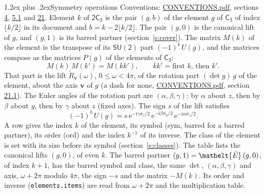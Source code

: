 \documentclass[10pt,a4paper]{article}
\makeatletter
\renewcommand\section{\@startsection{section}{1}{\z@}{-3ex plus -1ex minus -.2ex}%
  {1.2ex plus .2ex}{\normalfont\large\sffamily\bfseries\color{parttitle}}}
\numberwithin{equation}{section}
\newcommand{\eltfont}[1]{{\let\sigma\eltsigma\mathelt{#1}}}
\newcommand{\grp}[1]{\mathsf{#1}}
\newcommand{\elt}[1]{\eltfont{#1}}
\newcommand{\vv}{\mathbf{v}}
\newcommand{\iunit}{\mathrm{i}}
\newcommand{\expe}{\mathrm{e}}
\newcommand{\barred}[1]{\bar{#1}}
\newcommand{\lift}[1]{\tilde{#1}}
\newcommand{\pauli}[1]{\sigma_{#1}}
\makeatother
\begin{document}
\section{Symmetry operations}\label{s:elements}
Conventions: \href{../../CONVENTIONS.pdf}{CONVENTIONS.pdf}, sections \href{../../../rotation/CONVENTIONS.pdf\#conv.4}{4}, \href{../../../rotation/CONVENTIONS.pdf\#conv.5.1}{5.1} and \href{../../CONVENTIONS.pdf\#conv.21}{21}.
\leavevmode\label{n:index.element}\label{n:element.g}Element $k$ of $\grp{2C_{3}}$ is the pair $(g, b)$ of the element $g$ of \href{../../../rotation/data/pdf/C3.pdf}{$\grp{C_{3}}$} of index $\lfloor k/2\rfloor$ in its document and $b = k - 2\lfloor k/2\rfloor$. The pair $(g, 0)$ is the canonical lift of $g$, and $(g, 1)$ is its barred partner (section~\ref{s:cover}). \label{n:matrix.element.pin}\label{n:matrix.element}The matrix $M(k)$ of the element is the transpose of its $\grp{SU(2)}$ part $(-1)^{b}\,U(g)$, and the matrices compose as the matrices $P(g)$ of the elements of $\grp{C_{3}}$:
\begin{equation}\label{e:mprod}M(k)\,M(k') = M(kk'),\qquad kk' = \text{first } k\text{, then } k'.\end{equation}
\leavevmode\label{n:angle.omega}\label{n:vector.axis}\label{n:vector.pole}That part is the lift $\lift{R}_{\vv}(\omega)$, $0 \le \omega < 4\pi$, of the rotation part $(\det g)\,g$ of the element, about the axis $\vv$ of $g$ (a dash for none, \href{../../CONVENTIONS.pdf}{CONVENTIONS.pdf}, section \href{../../CONVENTIONS.pdf\#conv.21.1}{21.1}). \label{n:angle.euler.alpha}\label{n:angle.euler.beta}\label{n:angle.euler.gamma}\label{n:vector.coordinates}The Euler angles of the rotation part are $(\alpha,\beta,\gamma)$: by $\alpha$ about $z$, then by $\beta$ about $y$, then by $\gamma$ about $z$ (fixed axes). \label{n:local.euler.sign}The sign $s$ of the lift satisfies
\begin{equation}\label{e:euler}(-1)^{b}\,U(g) = s\,\expe^{-\iunit\gamma\pauli{z}/2}\,\expe^{-\iunit\beta\pauli{y}/2}\,\expe^{-\iunit\alpha\pauli{z}/2}.\end{equation}
\leavevmode\label{n:index.element.inverse}\label{n:head.sym}\label{n:head.ord}A row gives the index $k$ of the element, its symbol (sym, barred for a barred partner), its order (ord) and the index $k^{-1}$ of its inverse. \label{n:head.class}The class of the element is set with its size before its symbol (section~\ref{s:classes}).
The table lists the canonical lifts $(g, 0)$, of even $k$. The barred partner $(g, 1) = \elt{\barred{E}}\,(g, 0)$, of index $k + 1$, has the barred symbol and class, the same $\det$, $(\alpha,\beta,\gamma)$ and axis, $\omega + 2\pi$ modulo $4\pi$, the sign $-s$ and the matrix $-M(k)$. Its order and inverse (\texttt{elements.items}) are read from $\omega + 2\pi$ and the multiplication table.
\end{document}

